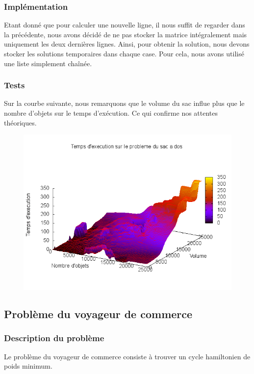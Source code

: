 \subsubsection{Implémentation}\label{bag_impl}
Etant donné que pour calculer une nouvelle ligne, il nous suffit de regarder dans la précédente, nous 
avons décidé de ne pas stocker la matrice intégralement mais uniquement les deux dernières lignes.
Ainsi, pour obtenir la solution, nous devons stocker les solutions temporaires dans chaque case.
Pour cela, nous avons utilisé une liste simplement chaînée.

\subsubsection{Tests}
Sur la courbe suivante, nous remarquons que le volume du sac influe plus que le nombre d'objets sur le temps d'exécution. Ce qui confirme nos attentes théoriques.
\begin{figure}[H]
	\includegraphics[width=\linewidth]{../pratique/prog_dynamique_dev/res/bag.png}
\end{figure}


\subsection{Problème du voyageur de commerce}

\subsubsection{Description du problème}
Le problème du voyageur de commerce consiste à trouver un cycle hamiltonien de poids minimum.
